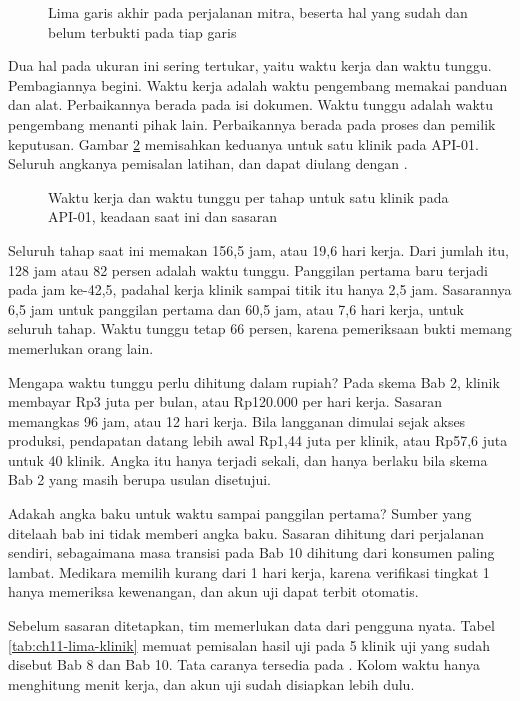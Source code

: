 \begin{figure}[!htb]
  \centering
  
  \caption{Lima garis akhir pada perjalanan mitra, beserta hal yang sudah dan belum terbukti pada tiap garis}
  \label{fig:ch11-ukuran}
\end{figure}

Dua hal pada ukuran ini sering tertukar, yaitu waktu kerja dan waktu tunggu. Pembagiannya begini. Waktu kerja adalah
waktu pengembang memakai panduan dan alat. Perbaikannya berada pada isi dokumen. Waktu tunggu adalah waktu pengembang
menanti pihak lain. Perbaikannya berada pada proses dan pemilik keputusan. Gambar \ref{fig:ch11-perjalanan} memisahkan
keduanya untuk satu klinik pada API-01. Seluruh angkanya pemisalan latihan, dan dapat diulang dengan
.

\begin{figure}[!htb]
  \centering
  
  \caption{Waktu kerja dan waktu tunggu per tahap untuk satu klinik pada API-01, keadaan saat ini dan sasaran}
  \label{fig:ch11-perjalanan}
\end{figure}

Seluruh tahap saat ini memakan 156,5 jam, atau 19,6 hari kerja. Dari jumlah itu, 128 jam atau 82 persen adalah waktu
tunggu. Panggilan pertama baru terjadi pada jam ke-42,5, padahal kerja klinik sampai titik itu hanya 2,5 jam. Sasarannya
6,5 jam untuk panggilan pertama dan 60,5 jam, atau 7,6 hari kerja, untuk seluruh tahap. Waktu tunggu tetap 66 persen,
karena pemeriksaan bukti memang memerlukan orang lain.

Mengapa waktu tunggu perlu dihitung dalam rupiah? Pada skema Bab 2, klinik membayar Rp3 juta per bulan, atau Rp120.000
per hari kerja. Sasaran memangkas 96 jam, atau 12 hari kerja. Bila langganan dimulai sejak akses produksi, pendapatan
datang lebih awal Rp1,44 juta per klinik, atau Rp57,6 juta untuk 40 klinik. Angka itu hanya terjadi sekali, dan hanya
berlaku bila skema Bab 2 yang masih berupa usulan disetujui.

Adakah angka baku untuk waktu sampai panggilan pertama? Sumber yang ditelaah bab ini tidak memberi angka baku. Sasaran dihitung dari perjalanan sendiri, sebagaimana
masa transisi pada Bab 10 dihitung dari konsumen paling lambat. Medikara memilih kurang dari 1 hari kerja, karena
verifikasi tingkat 1 hanya memeriksa kewenangan, dan akun uji dapat terbit otomatis.

Sebelum sasaran ditetapkan, tim memerlukan data dari pengguna nyata. Tabel \ref{tab:ch11-lima-klinik} memuat pemisalan
hasil uji pada 5 klinik uji yang sudah disebut Bab 8 dan Bab 10. Tata caranya tersedia pada
. Kolom waktu hanya menghitung menit kerja, dan akun uji sudah
disiapkan lebih dulu.


